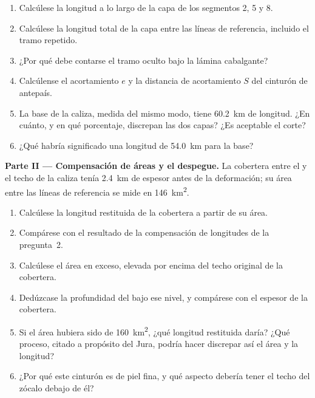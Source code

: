 \begin{problem}
\begin{enumerate}
\item Calcúlese la longitud a lo largo de la capa de los segmentos 2, 5 y 8.
\item Calcúlese la longitud total de la capa entre las líneas de referencia, incluido el tramo
repetido.
\item ¿Por qué debe contarse el tramo oculto bajo la lámina cabalgante?
\item Calcúlense el acortamiento $e$ y la distancia de acortamiento $S$ del cinturón de antepaís.
\item La base de la caliza, medida del mismo modo, tiene \qty{60.2}{km} de longitud. ¿En cuánto,
y en qué porcentaje, discrepan las dos capas? ¿Es aceptable el corte?
\item ¿Qué habría significado una longitud de \qty{54.0}{km} para la base?
\end{enumerate}

\noindent\textbf{Parte II --- Compensación de áreas y el despegue.} La cobertera entre el
 y el techo de la caliza tenía \qty{2.4}{km} de espesor antes de la deformación; su
área entre las líneas de referencia se mide en \qty{146}{km^2}.
\begin{enumerate}[resume]
\item Calcúlese la longitud restituida de la cobertera a partir de su área.
\item Compárese con el resultado de la compensación de longitudes de la pregunta~2.
\item Calcúlese el área en exceso, elevada por encima del techo original de la cobertera.
\item Dedúzcase la profundidad del  bajo ese nivel, y compárese con el espesor de la
cobertera.
\item Si el área hubiera sido de \qty{160}{km^2}, ¿qué longitud restituida daría? ¿Qué proceso,
citado a propósito del Jura, podría hacer discrepar así el área y la longitud?
\item ¿Por qué este cinturón es de piel fina, y qué aspecto debería tener el techo del zócalo
debajo de él?
\end{enumerate}


\end{problem}
